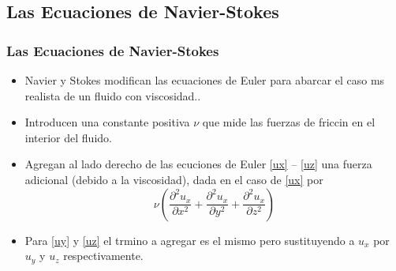 \documentclass[serif,9pt]{beamer}
\begin{document}
\subsection{Las Ecuaciones de Navier-Stokes}
\begin{frame}\frametitle{Las Ecuaciones de Navier-Stokes}

\begin{itemize}

\item  Navier y Stokes modifican las ecuaciones de Euler para abarcar el caso ms realista de un fluido con viscosidad.. 

\pause
\medskip

\item Introducen una constante positiva $\nu$ que mide las fuerzas de friccin en el interior del fluido.
\pause
\medskip

\item Agregan al lado derecho de las ecuciones de Euler \eqref{ux} -- \eqref{uz} una fuerza adicional (debido a la viscosidad), dada en el caso de \eqref{ux} por
\begin{equation*}
\nu \left(\frac{\partial^2 u_x}{\partial x^2} + \frac{\partial^2 u_x}{\partial y^2} + \frac{\partial^2 u_x}{\partial z^2}\right)
\end{equation*}
\pause 
\smallskip

\item Para \eqref{uy} y \eqref{uz} el trmino a agregar es el mismo pero sustituyendo a $u_x$ por $u_y$ y $u_z$ respectivamente.

\end{itemize}
\end{frame}
\end{document}
